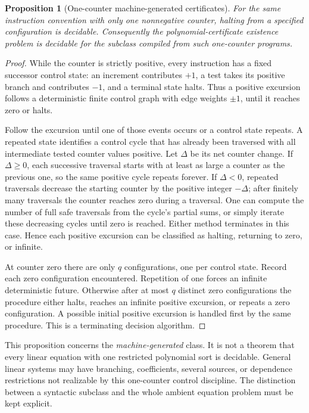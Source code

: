 \documentclass[11pt,letterpaper]{article}
\numberwithin{equation}{section}
\newtheorem{proposition}[theorem]{Proposition}
\theoremstyle{definition}
\begin{document}
\begin{proposition}[One-counter machine-generated certificates]\label{pwh:bt:prop:onecounter}
For the same instruction convention with only one nonnegative counter,
halting from a specified configuration is decidable. Consequently the
polynomial-certificate existence problem is decidable for the subclass
compiled from such one-counter programs.
\end{proposition}
\begin{proof}
While the counter is strictly positive, every instruction has a fixed
successor control state: an increment contributes $+1$, a test takes
its positive branch and contributes $-1$, and a terminal state halts.
Thus a positive excursion follows a deterministic finite control graph
with edge weights $\pm1$, until it reaches zero or halts.

Follow the excursion until one of those events occurs or a control
state repeats. A repeated state identifies a control cycle that has
already been traversed with all intermediate tested counter values
positive. Let $\Delta$ be its net counter change. If $\Delta\ge0$, each
successive traversal starts with at least as large a counter as the
previous one, so the same positive cycle repeats forever. If
$\Delta<0$, repeated traversals decrease the starting counter by the
positive integer $-\Delta$; after finitely many traversals the counter
reaches zero during a traversal. One can compute the number of full
safe traversals from the cycle's partial sums, or simply iterate these
decreasing cycles until zero is reached. Either method terminates in
this case. Hence each positive excursion can be classified as halting,
returning to zero, or infinite.

At counter zero there are only $q$ configurations, one per control
state. Record each zero configuration encountered. Repetition of one
forces an infinite deterministic future. Otherwise after at most $q$
distinct zero configurations the procedure either halts, reaches an
infinite positive excursion, or repeats a zero configuration. A
possible initial positive excursion is handled first by the same
procedure. This is a terminating decision algorithm.
\end{proof}

This proposition concerns the \emph{machine-generated} class. It is
not a theorem that every linear equation with one restricted polynomial
sort is decidable. General linear systems may have branching,
coefficients, several sources, or dependence restrictions not realizable
by this one-counter control discipline. The distinction between a
syntactic subclass and the whole ambient equation problem must be kept
explicit.
\end{document}
